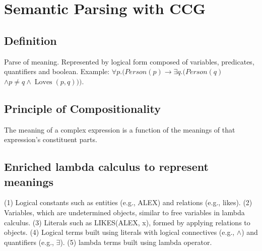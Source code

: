 \section{Semantic Parsing with CCG}

\subsection*{Definition}
Parse of meaning. Represented by logical form composed of variables, predicates, quantifiers and boolean. Example: $\forall p .(P e r s o n(p) \rightarrow \exists q .(P e r s o n(q)$
$\wedge p \neq q \wedge \operatorname{Loves}(p, q)))$.

\subsection*{Principle of Compositionality}
The meaning of a complex expression is a function of
the meanings of that expression's constituent parts.

\subsection*{Enriched lambda calculus to represent meanings}

(1) Logical constants such as entities (e.g., ALEX) and relations (e.g., likes). 
(2) Variables, which are undetermined objects, similar to free variables in lambda calculus.
(3) Literals such as LIKES(ALEX, x), formed by applying relations to objects.
(4) Logical terms built using literals with logical connectives (e.g., $\land$) and quantifiers (e.g., $\exists$).
(5) lambda terms built using lambda operator.